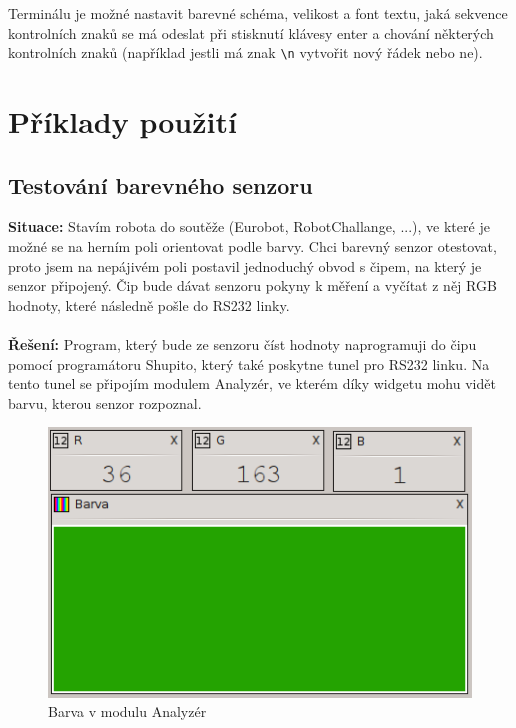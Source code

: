 \documentclass[12pt, a4paper, oneside]{article}
\begin{document}
Terminálu je možné nastavit barevné schéma, velikost a font textu, jaká sekvence kontrolních znaků se má odeslat při stisknutí klávesy enter a chování některých kontrolních znaků (například jestli má znak \verb|\n| vytvořit nový řádek nebo ne).

\newpage
\section{Příklady použití}
\subsection{Testování barevného senzoru}
{\bf Situace:} Stavím robota do soutěže (Eurobot, RobotChallange, ...), ve které je možné se na herním poli orientovat podle barvy. Chci barevný senzor otestovat, proto jsem na nepájivém poli postavil jednoduchý obvod s čipem, na který je senzor připojený. Čip bude dávat senzoru pokyny k měření a vyčítat z něj RGB hodnoty, které následně pošle do RS232 linky.\\
\\
{\bf Řešení:} Program, který bude ze senzoru číst hodnoty naprogramuji do čipu pomocí programátoru Shupito, který také poskytne tunel pro RS232 linku. Na tento tunel se připojím modulem Analyzér, ve kterém díky widgetu  mohu vidět barvu, kterou senzor rozpoznal.

\begin{figure}[h]
\begin{center}
\includegraphics{img/use_color.png}
\caption{Barva v modulu Analyzér}
\end{center}
\end{figure}

\newpage
\end{document}
